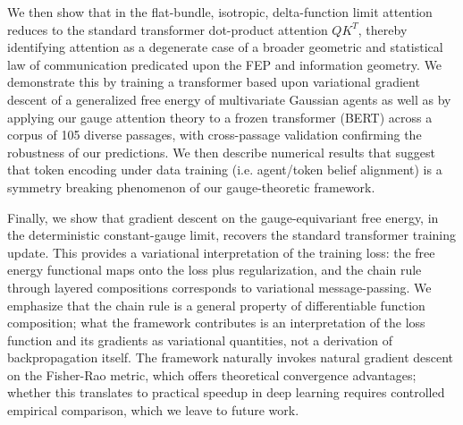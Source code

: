 \documentclass[twoside,11pt]{article}
\begin{document}
We then show that in the flat-bundle, isotropic, delta-function limit attention reduces to the standard transformer dot-product attention $QK^T$, thereby identifying attention as a degenerate case of a broader geometric and statistical law of communication predicated upon the FEP and information geometry.  We demonstrate this by training a transformer based upon variational gradient descent of a generalized free energy of multivariate Gaussian agents as well as by applying our gauge attention theory to a frozen transformer (BERT) across a corpus of 105 diverse passages, with cross-passage validation confirming the robustness of our predictions.  We then describe numerical results that suggest that token encoding under data training (i.e. agent/token belief alignment) is a symmetry breaking phenomenon of our gauge-theoretic framework.

Finally, we show that gradient descent on the gauge-equivariant free energy, in the deterministic constant-gauge limit, recovers the standard transformer training update. This provides a variational interpretation of the training loss: the free energy functional maps onto the loss plus regularization, and the chain rule through layered compositions corresponds to variational message-passing. We emphasize that the chain rule is a general property of differentiable function composition; what the framework contributes is an interpretation of the loss function and its gradients as variational quantities, not a derivation of backpropagation itself. The framework naturally invokes natural gradient descent on the Fisher-Rao metric, which offers theoretical convergence advantages; whether this translates to practical speedup in deep learning requires controlled empirical comparison, which we leave to future work.
\end{document}
